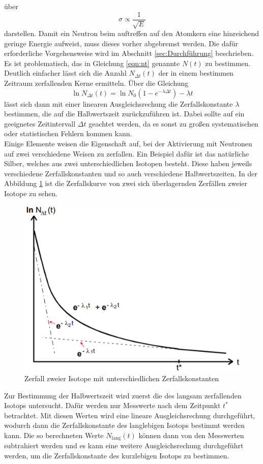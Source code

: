 über 
\begin{equation}
    \sigma \propto \frac{1}{\sqrt{E}}
\end{equation}
darstellen.
Damit ein Neutron beim auftreffen auf den Atomkern eine hinreichend geringe Energie aufweist, muss dieses vorher abgebremst werden.
Die dafür erforderliche Vorgehensweise wird im Abschnitt \ref{sec:Durchführung} beschrieben.
\\
Es ist problematisch, das in Gleichung \ref{eqn:nt} genannte $N(t)$ zu bestimmen. Deutlich einfacher lässt sich die Anzahl 
$N_{\Delta t}(t)$ der in einem bestimmen Zeitraum zerfallenden Kerne ermitteln. Über die Gleichung 
\begin{equation}
    \ln{N_{\Delta t}(t)} = \ln{N_0}(1 - e^{-\lambda\Delta t}) -\lambda t
    \label{eqn:N}
\end{equation}
lässt sich dann mit einer linearen Ausgleichsrechung die Zerfallskonstante $\lambda$ bestimmen, die auf die Halbwertszeit
zurückzuführen ist. Dabei sollte auf ein geeignetes Zeitintervall $\Delta t$ geachtet werden, da es sonst zu großen systematischen
oder statistischen Fehlern kommen kann. 
\\
Einige Elemente weisen die Eigenschaft auf, bei der Aktivierung mit Neutronen auf zwei verschiedene Weisen zu zerfallen. Ein 
Beispiel dafür ist das natürliche Silber, welches aus zwei unterschiedlichen Isotopen besteht. Diese haben jeweils verschiedene
Zerfallskonstanten und so auch verschiedene Halbwertszeiten. In der Abbildung \ref{fig:2iso} ist die Zerfallskurve von zwei
sich überlagernden Zerfällen zweier Isotope zu sehen.
\begin{figure}
    \centering
    \includegraphics[width=\textwidth]{data/zerfall.png}
    \caption{Zerfall zweier Isotope mit unterschiedlichen Zerfallskonstanten}
    \label{fig:2iso}
\end{figure}
Zur Bestimmung der Halbwertszeit wird zuerst die des langsam zerfallenden Isotops untersucht. Dafür werden nur Messwerte nach dem 
Zeitpunkt $t^{*}$ betrachtet. Mit diesen Werten wird eine lineare Ausgleichsrechung durchgeführt, wodurch dann die Zerfallskonstante
des langlebigen Isotops bestimmt werden kann. Die so berechneten Werte $N_\text{lang}(t)$ können dann von den Messwerten 
subtrahiert werden und es kann eine weitere Ausgleichsrechung durchgeführt werden, um die Zerfallskonstante des kurzlebigen
Isotops zu bestimmen. 